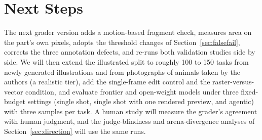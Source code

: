 \documentclass[11pt]{article}
\begin{document}
\section{Next Steps}

The next grader version adds a motion-based fragment check, measures area on the part's own pixels, adopts the threshold changes of Section~\ref{sec:falsefail}, corrects the three annotation defects, and re-runs both validation studies side by side. We will then extend the illustrated split to roughly 100 to 150 tasks from newly generated illustrations and from photographs of animals taken by the authors (a realistic tier), add the single-frame edit control and the raster-versus-vector condition, and evaluate frontier and open-weight models under three fixed-budget settings (single shot, single shot with one rendered preview, and agentic) with three samples per task. A human study will measure the grader's agreement with human judgment, and the judge-blindness and arena-divergence analyses of Section~\ref{sec:direction} will use the same runs.




\appendix
\end{document}
